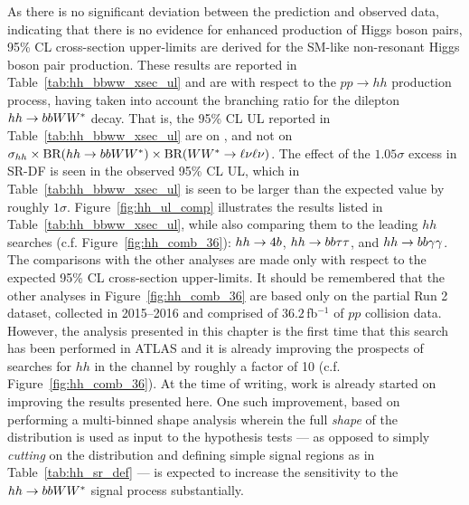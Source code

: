 As there is no significant deviation between the prediction and observed data,
indicating that there is no evidence for enhanced production of Higgs boson pairs, 95\% CL
cross-section upper-limits are derived for the SM-like non-resonant Higgs boson pair
production.
These results are reported in Table~\ref{tab:hh_bbww_xsec_ul} and are with respect to the
$pp \rightarrow hh$ production process, having taken into account the branching ratio for the dilepton $hh \rightarrow bbWW^*$
decay.
That is, the 95\% CL UL reported in Table~\ref{tab:hh_bbww_xsec_ul} are on \sigmaHH, and not
on $\sigma_{hh} \times \text{BR}(hh \rightarrow bbWW^*) \times \text{BR}(WW^* \rightarrow \ell \nu \ell \nu)$.
The effect of the $1.05\sigma$ excess in SR-DF is seen in the observed 95\% CL UL, which in Table~\ref{tab:hh_bbww_xsec_ul}
is seen to be larger than the expected value by roughly $1\sigma$.
Figure~\ref{fig:hh_ul_comp} illustrates the results listed in Table~\ref{tab:hh_bbww_xsec_ul},
while also comparing them to the leading $hh$ searches (c.f. Figure~\ref{fig:hh_comb_36}): $hh \rightarrow 4b$,
$hh \rightarrow bb\tau\tau$, and $hh \rightarrow bb\gamma\gamma$.
The comparisons with the other analyses are made only with respect to the expected 95\% CL cross-section upper-limits.
It should be remembered that the other analyses in Figure~\ref{fig:hh_comb_36} are based only on the partial Run 2
dataset, collected in 2015--2016 and comprised of $36.2$\,fb$^{-1}$ of $pp$ collision data.
However, the analysis presented in this chapter is the first time that this search has been performed
in ATLAS and it is already improving the prospects of searches for $hh$ in the \bbww channel by roughly
a factor of 10 (c.f. Figure~\ref{fig:hh_comb_36}).
At the time of writing, work is already started on improving the results presented here.
One such improvement, based on performing a multi-binned shape analysis wherein the full \textit{shape} of the \dhh
distribution is used as input to the hypothesis tests --- as opposed to simply \textit{cutting} on the \dhh distribution
and defining simple signal regions as in Table~\ref{tab:hh_sr_def} --- is expected to increase the sensitivity to the $hh \rightarrow bbWW^*$ signal process
substantially.




